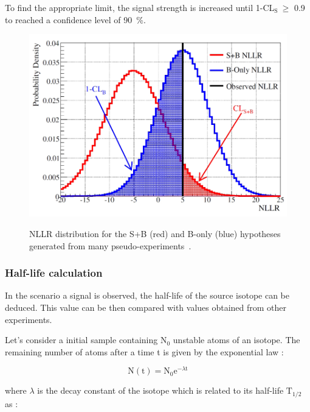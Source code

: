 \documentclass[main.tex]{subfiles}
\begin{document}
\bigskip


\NI To find the appropriate limit, the signal strength is increased until 1-CL$_\text{S}~\geq$ 0.9 to reached a confidence level of 90~\%. 


\begin{figure}[h!]
\centering
\includegraphics[scale=0.35]{pictures/Chap6/NLLR.png}
\label{NLLR}
\caption{NLLR distribution for the S+B (red) and B-only (blue) hypotheses generated from many pseudo-experiments~\cite{NLLR}.}
\end{figure}





\subsubsection{Half-life calculation}\label{sec:HalfLifeAnalysis}


\NI In the scenario a signal is observed, the half-life of the source isotope can be deduced. This value can be then compared with values obtained from other experiments.


\bigskip


\NI Let's consider a initial sample containing N$_\text{0}$ unstable atoms of an isotope. The remaining number of atoms after a time t is given by the exponential law :  


\begin{equation}\label{eq:exponentialLaw}
\text{N}(\text{t}) = \text{N}_\text{0} \text{e}^{-\lambda \text{t}}
\end{equation}


\bigskip


\NI where $\lambda$ is the decay constant of the isotope which is related to its half-life $\text{T}_{\text{1/2}}$ as : 
\end{document}
